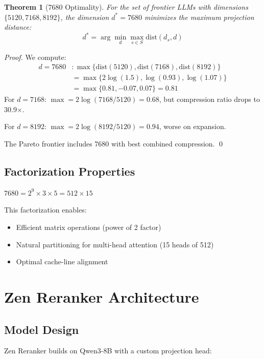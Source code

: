 \documentclass[11pt,letterpaper]{article}
\newtheorem{theorem}{Theorem}[section]
\begin{document}
\begin{theorem}[7680 Optimality]
For the set of frontier LLMs with dimensions $\{5120, 7168, 8192\}$, the dimension $d^* = 7680$ minimizes the maximum projection distance:
\begin{equation}
d^* = \arg\min_d \max_{s \in S} \text{dist}(d_s, d)
\end{equation}
\end{theorem}

\begin{proof}
We compute:
\begin{align}
d = 7680&: \max\{\text{dist}(5120), \text{dist}(7168), \text{dist}(8192)\} \\
&= \max\{2\log(1.5), \log(0.93), \log(1.07)\} \\
&= \max\{0.81, -0.07, 0.07\} = 0.81
\end{align}
For $d = 7168$: $\max = 2\log(7168/5120) = 0.68$, but compression ratio drops to 30.9$\times$.

For $d = 8192$: $\max = 2\log(8192/5120) = 0.94$, worse on expansion.

The Pareto frontier includes 7680 with best combined compression. \qed
\end{proof}

\subsection{Factorization Properties}

$7680 = 2^9 \times 3 \times 5 = 512 \times 15$

This factorization enables:
\begin{itemize}
    \item Efficient matrix operations (power of 2 factor)
    \item Natural partitioning for multi-head attention (15 heads of 512)
    \item Optimal cache-line alignment
\end{itemize}

\section{Zen Reranker Architecture}
\label{sec:architecture}

\subsection{Model Design}

Zen Reranker builds on Qwen3-8B with a custom projection head:
\end{document}
